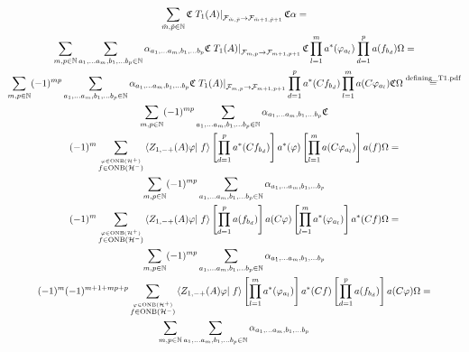 \documentclass[a4paper,12pt]{article}
\newcommand{\equaltext}[1]{\ensuremath{\stackrel{\text{#1}}{=}}}
\begin{document}
\begin{multline}
\sum_{\tilde{m},\tilde{p}\in \mathbb{N}}\mathfrak{C} \left. T_1(A)\right|_{\mathcal{F}_{\tilde{m},\tilde{p}}\rightarrow\mathcal{F}_{\tilde{m}+1,\tilde{p}+1}} \mathfrak{C} \alpha= \\
\sum_{m,p \in \mathbb{N}} \sum_{a_1, \dots a_m, b_1, \dots b_p \in \mathbb{N}} \alpha_{a_1, \dots a_m, b_1, \dots b_p} \mathfrak{C} \left. T_1(A)\right|_{\mathcal{F}_{m,p}\rightarrow\mathcal{F}_{m+1,p+1}} \mathfrak{C} \prod_{l=1}^m a^*(\varphi_{a_l})\prod_{d=1}^p a(f_{b_d})\Omega=\\
\sum_{m,p \in \mathbb{N}} (-1)^{m p}\sum_{a_1, \dots a_m, b_1, \dots b_p \in \mathbb{N}} \alpha_{a_1, \dots a_m, b_1, \dots b_p} \mathfrak{C} \left. T_1(A)\right|_{\mathcal{F}_{m,p}\rightarrow\mathcal{F}_{m+1,p+1}} \prod_{d=1}^p a^*(C f_{b_d}) \prod_{l=1}^m a(C \varphi_{a_l})\mathfrak{C}\Omega\equaltext{defining\textunderscore T1.pdf}\\
\sum_{m,p \in \mathbb{N}} (-1)^{m p}\sum_{a_1, \dots a_m, b_1, \dots b_p \in \mathbb{N}} \alpha_{a_1, \dots a_m, b_1, \dots b_p} \mathfrak{C}  \\
(-1)^{m}\sum_{\stackrel{\varphi \in \text{ONB}(\mathcal{H}^+)}{f\in \text{ONB}(\mathcal{H}^-)}}\left<Z_{1,-+}(A)\varphi\right|\left. f\right>
\left[\prod_{d=1}^p a^*(C f_{b_d})\right] a^*(\varphi)\left[\prod_{l=1}^m a(C \varphi_{a_l}) \right]
 a(f) \Omega=\\
 \sum_{m,p \in \mathbb{N}} (-1)^{m p}\sum_{a_1, \dots a_m, b_1, \dots b_p \in \mathbb{N}} \alpha_{a_1, \dots a_m, b_1, \dots b_p}  \\
(-1)^{m}\sum_{\stackrel{\varphi \in \text{ONB}(\mathcal{H}^+)}{f\in \text{ONB}(\mathcal{H}^-)}}\left<Z_{1,-+}(A)\varphi\right|\left. f\right>
\left[\prod_{d=1}^p a( f_{b_d})\right] a(C \varphi)\left[\prod_{l=1}^m a^*( \varphi_{a_l}) \right]
 a^*(C f) \Omega=\\
  \sum_{m,p \in \mathbb{N}} (-1)^{m p}\sum_{a_1, \dots a_m, b_1, \dots b_p \in \mathbb{N}} \alpha_{a_1, \dots a_m, b_1, \dots b_p}  \\
(-1)^{m}(-1)^{m+1 + m p + p}\sum_{\stackrel{\varphi \in \text{ONB}(\mathcal{H}^+)}{f\in \text{ONB}(\mathcal{H}^-)}}\left<Z_{1,-+}(A)\varphi\right|\left. f\right>
\left[\prod_{l=1}^m a^*( \varphi_{a_l}) \right]
 a^*(C f)  \left[\prod_{d=1}^p a( f_{b_d})\right] a(C \varphi)\Omega=\\
   \sum_{m,p \in \mathbb{N}} \sum_{a_1, \dots a_m, b_1, \dots b_p \in \mathbb{N}} \alpha_{a_1, \dots a_m, b_1, \dots b_p}  \\

\end{multline}
\end{document}
